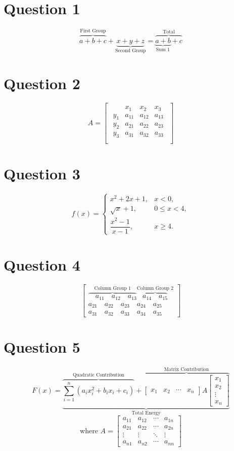 \documentclass{article}
\begin{document}
\section{Question 1}
\[
\overbrace{a + b + c }^{\text{First Group}} + \underbrace{x+y+z}_{\text{Second Group}}
=
\overbrace{\underbrace{a + b}_{\text{Sum 1}} + c}^{\text{Total}}
\]
\section{Question 2}
\[
A =
\begin{bmatrix}
\begin{array}{c|ccc}
& x_1 & x_2 & x_3 \\
\hline
y_1 & a_{11} & a_{12} & a_{13} \\
y_2 & a_{21} & a_{22} & a_{23} \\
y_3 & a_{31} & a_{32} & a_{33} \\
\end{array}
\end{bmatrix}
\]
\section{Question 3}
\[
f(x) =
\begin{cases}
x^2 + 2x + 1, & x < 0, \\
\sqrt{x} + 1, & 0 \le x < 4, \\
\dfrac{x^2 - 1}{x - 1}, & x \ge 4.
\end{cases}
\]
\section{Question 4}
\[
\begin{bmatrix}
\overbrace{\quad a_{11} \quad a_{12} \quad a_{13}}^{\text{Column Group 1}}
\overbrace{ a_{14} \quad a_{15}}^{\text{Column Group 2}} \\
a_{21} \quad a_{22} \quad a_{23} \quad a_{24} \quad a_{25} \\
a_{31} \quad a_{32} \quad a_{33} \quad a_{34} \quad a_{35}
\end{bmatrix}
\]
\section{Question 5}
\[
F(x) =
\underbrace{
\overbrace{
\sum_{i=1}^{n} \left(a_i x_i^2 + b_i x_i + c_i \right)
}^{\text{Quadratic Contribution}}
+
\overbrace{
\begin{bmatrix}
x_1 & x_2 & \cdots & x_n
\end{bmatrix}
A
\begin{bmatrix}
x_1 \\
x_2 \\
\vdots \\
x_n
\end{bmatrix}
}^{\text{Matrix Contribution}}
}_{\text{Total Energy}}
\]
\[
\text{where }
A =
\begin{bmatrix}
a_{11} & a_{12} & \cdots & a_{1n} \\
a_{21} & a_{22} & \cdots & a_{2n} \\
\vdots & \vdots & \ddots & \vdots \\
a_{n1} & a_{n2} & \cdots & a_{nn}
\end{bmatrix}
\]
\end{document}
